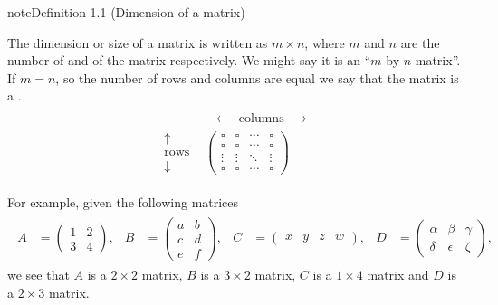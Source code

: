 \documentclass[letterpaper,10pt,english]{jupyterBook}
\begin{document}
\ignorespaces \label{_pages/1.0_Matrices:matrix-dimension-definition}
\begin{sphinxadmonition}{note}{Definition 1.1 (Dimension of a matrix)}



\sphinxAtStartPar
The dimension or size of a matrix is written as \(m \times n\), where \(m\) and \(n\) are the number of  and  of the matrix respectively. We might say it is an “\(m\) by \(n\) matrix”. If \(m = n\), so the number of rows and columns are equal we say that the matrix is a .
\begin{equation*}
\begin{split} \begin{align*}
    &\,\,\,\begin{matrix} \leftarrow & \!\!\text{columns}\!\! & \rightarrow \end{matrix} \\
    \begin{matrix} \uparrow \\ \text{rows} \\ \downarrow \end{matrix}
    &\begin{pmatrix}
        \square & \square & \cdots & \square \\
        \square & \square & \cdots & \square \\
        \vdots & \vdots & \ddots & \vdots \\
        \square & \square & \cdots & \square
    \end{pmatrix}
\end{align*} \end{split}
\end{equation*}\end{sphinxadmonition}

\sphinxAtStartPar
For example, given the following matrices
\begin{equation*}
\begin{split} \begin{align*}
    A &= \begin{pmatrix} 1 & 2 \\ 3 & 4 \end{pmatrix}, &
    B &= \begin{pmatrix} a & b \\ c & d \\ e & f \end{pmatrix}, &
    C &= \begin{pmatrix} x & y & z & w \end{pmatrix}, &
    D &= \begin{pmatrix} \alpha & \beta & \gamma \\ \delta & \epsilon & \zeta \end{pmatrix},
\end{align*} \end{split}
\end{equation*}
\sphinxAtStartPar
we see that \(A\) is a \(2\times 2\) matrix, \(B\) is a \(3 \times 2\) matrix, \(C\) is a \(1 \times 4\) matrix and \(D\) is a \(2 \times 3\) matrix.
\end{document}
